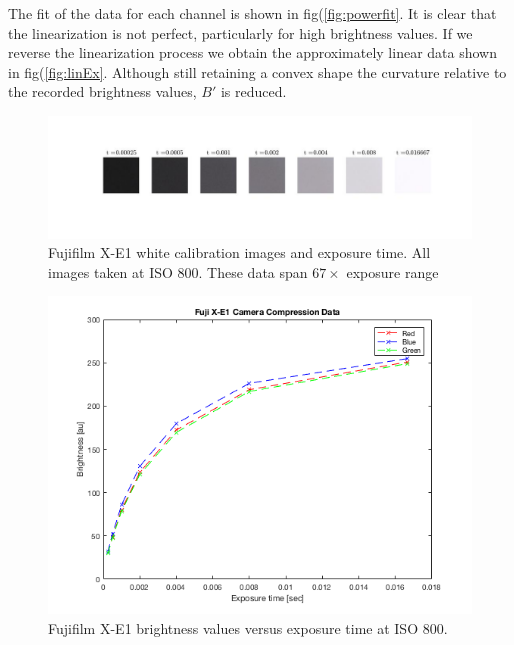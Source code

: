 \documentclass[a4paper]{article}
\begin{document}
The fit of the data for each channel is shown in fig(\ref{fig:powerfit}.  It is clear that the linearization is not perfect, particularly for high brightness values. If we reverse the linearization process we obtain the approximately linear data shown in fig(\ref{fig:linEx}.  Although still retaining a convex shape the curvature relative to the recorded brightness values, $B'$ is reduced. 
\begin{figure}[htb!]
    \begin{center}
        \includegraphics[width=\textwidth]{white_fuji.jpg}
	 \end{center}
    \caption{Fujifilm X-E1 white calibration images and exposure time. All images taken at ISO 800. These data span $67 \times$ exposure range} 
    \label{fig:white}
\end{figure}

\begin{figure}[htb!]
    \begin{center}
        \includegraphics[width=4 in]{powerfit.png}
	 \end{center}
    \caption{Fujifilm X-E1 brightness values versus exposure time at ISO 800.} 
    \label{fig:Ecal}
\end{figure}
\end{document}
